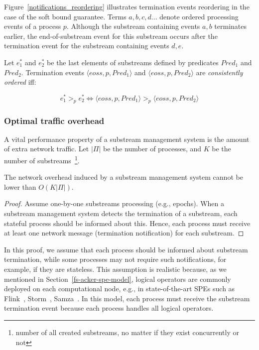 Figure~\ref{notifications_reordering} illustrates termination events reordering in the case of the soft bound guarantee. Terms $a,b,c,d...$ denote ordered processing events of a process $p$. Although the substream containing events $a,b$ terminates earlier, the end-of-substream event for this substream occurs after the termination event for the substream containing events $d,e$. 

\begin{definition}
Let $e^{*}_1$ and $e^{*}_2$ be the last elements of substreams defined by predicates $Pred_1$ and $Pred_2$. Termination events $\langle eoss, p, Pred_1\rangle$ and $\langle eoss, p, Pred_2\rangle$ are {\em consistently ordered} iff:

\begin{equation}
e^{*}_1 >_p e^{*}_2 \Leftrightarrow \langle eoss, p, Pred_1\rangle >_p \langle eoss, p, Pred_2\rangle
\end{equation}
\end{definition}

\subsubsection{Optimal traffic overhead}

A vital performance property of a substream management system is the amount of extra network traffic. Let $|\Pi|$ be the number of processes, and $K$ be the number of substreams~\footnote{number of all created substreams, no matter if they exist concurrently or not}. 

\begin{lemma}
The network overhead induced by a substream management system cannot be lower than $O(K|\Pi|)$. 
\end{lemma}
\begin{proof}
Assume one-by-one substreams processing (e.g., epochs). When a substream management system detects the termination of a substream, each stateful process should be informed about this. Hence, each process must receive at least one network message (termination notification) for each substream.
\end{proof}

In this proof, we assume that each process should be informed about substream termination, while some processes may not require such notifications, for example, if they are stateless. This assumption is realistic because, as we mentioned in Section~\ref{fs-acker-spe-model}, logical operators are commonly deployed on each computational node, e.g., in state-of-the-art SPEs such as Flink~\cite{Carbone:2017:SMA:3137765.3137777}, Storm~\cite{apache:storm}, Samza~\cite{Noghabi:2017:SSS:3137765.3137770}. In this model, each process must receive the substream termination event because each process handles all logical operators.

